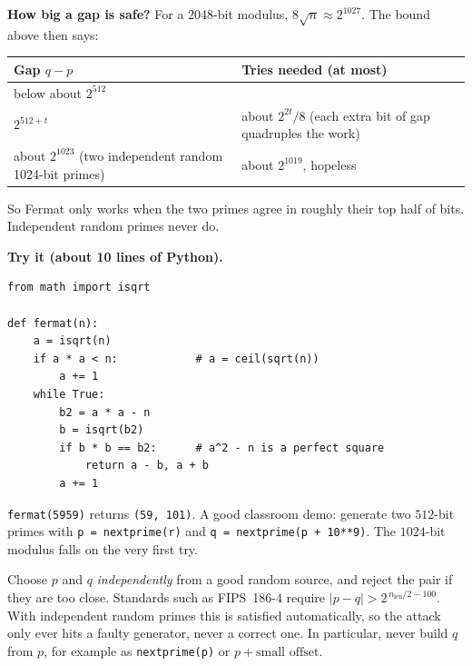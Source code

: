 \documentclass[11pt]{article}
\theoremstyle{definition}
\theoremstyle{remark}
\begin{document}
\textbf{How big a gap is safe?} For a 2048-bit modulus, $8\sqrt n\approx2^{1027}$. The bound above then says:
\begin{center}
\begin{tabular}{@{}>{\raggedright\arraybackslash}p{6.8cm}>{\raggedright\arraybackslash}p{7.6cm}@{}}
\toprule
\textbf{Gap $q-p$} & \textbf{Tries needed (at most)} \\
\midrule
below about $2^{512}$ & 1 \\
$2^{512+t}$ & about $2^{2t}/8$ (each extra bit of gap quadruples the work) \\
about $2^{1023}$ (two independent random 1024-bit primes) & about $2^{1019}$, hopeless \\
\bottomrule
\end{tabular}
\end{center}
So Fermat only works when the two primes agree in roughly their top half of bits. Independent random primes never do.

\textbf{Try it (about 10 lines of Python).}
\begin{verbatim}
from math import isqrt

def fermat(n):
    a = isqrt(n)
    if a * a < n:            # a = ceil(sqrt(n))
        a += 1
    while True:
        b2 = a * a - n
        b = isqrt(b2)
        if b * b == b2:      # a^2 - n is a perfect square
            return a - b, a + b
        a += 1
\end{verbatim}
\texttt{fermat(5959)} returns \texttt{(59, 101)}. A good classroom demo: generate two $512$-bit primes with \texttt{p = nextprime(r)} and \texttt{q = nextprime(p + 10**9)}. The $1024$-bit modulus falls on the very first try.

\begin{fixbox}
Choose $p$ and $q$ \emph{independently} from a good random source, and reject the pair if they are too close. Standards such as FIPS~186-4 require $|p-q|>2^{\,n_{\text{len}}/2-100}$. With independent random primes this is satisfied automatically, so the attack only ever hits a faulty generator, never a correct one. In particular, never build $q$ from $p$, for example as \texttt{nextprime(p)} or $p+\text{small offset}$.
\end{fixbox}
\end{document}
